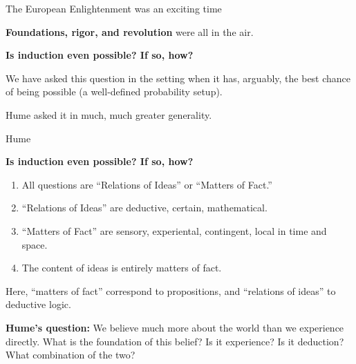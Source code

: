 \documentclass[8pt]{beamer}\usepackage[]{graphicx}\usepackage[]{color}
\begin{document}
\begin{frame}{The European Enlightenment was an exciting time}
\begin{minipage}{0.35 \textwidth}
\end{minipage}
%
\pause
\textbf{Foundations, rigor, and revolution} were all in the air.

\pause
\textbf{Is induction even possible?  If so, how?}

We have asked this question in the setting when it has, arguably, the best
chance of being possible (a well-defined probability setup).

Hume asked it in much, much greater generality.

\end{frame}


\begin{frame}{Hume}

\textbf{Is induction even possible?  If so, how?}
%
\begin{enumerate}
%
\item All questions are ``Relations of Ideas'' or ``Matters of Fact.''
\item ``Relations of Ideas'' are deductive, certain, mathematical.
\item ``Matters of Fact'' are sensory, experiental, contingent, local
in time and space.
\item The content of ideas is entirely matters of fact.
%
\end{enumerate}
%
Here, ``matters of fact'' correspond to propositions, and
``relations of ideas'' to deductive logic.

\textbf{Hume's question:} We believe much more about the world than we
experience directly.  What is the foundation of this belief?  Is it
experience?  Is it deduction?  What combination of the two?

\end{frame}


\end{document}
